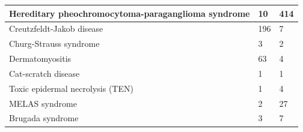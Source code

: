 \documentclass[10pt,letterpaper,two column,final]{article}
\begin{document}
\begin{center}
\begin{small}
\begin{tabular}{|p{6cm}|p{2.5cm}|p{2.5cm}|}
    Hereditary pheochromocytoma-paraganglioma syndrome & 10 & 414\\    \hline
    Creutzfeldt-Jakob disease & 196 & 7\\    \hline
    Churg-Strauss syndrome & 3 & 2\\    \hline
    Dermatomyositis & 63 & 4\\    \hline
    Cat-scratch disease & 1 & 1\\    \hline
    Toxic epidermal necrolysis (TEN) & 1 & 4\\    \hline
    MELAS syndrome & 2 & 27\\    \hline
    Brugada syndrome & 3 & 7\\    \hline
	\end{tabular}
\end{small}
\end{center}
\end{document}
